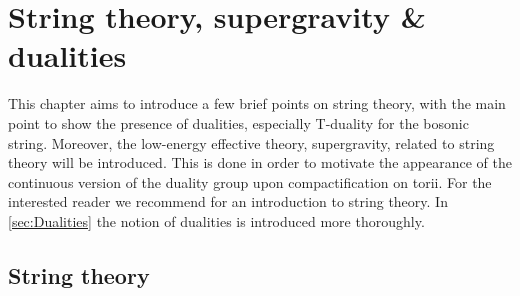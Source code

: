 \chapter{String theory, supergravity \& dualities}


This chapter aims to introduce a few brief points on string theory, with the main point to show the presence of dualities, especially T-duality for the bosonic string. Moreover, the low-energy effective theory, supergravity, related to string theory will be introduced. This is done in order to motivate the appearance of the continuous version of the duality group upon compactification on torii. For the interested reader we recommend \cite{Blumenhagen2013,TongLectureNotes} for an introduction to string theory. In \ref{sec:Dualities} the notion of dualities is introduced more thoroughly. 


\section{String theory}


